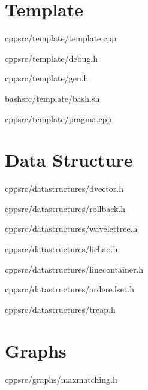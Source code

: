 \documentclass[portrait, 8pt, a4paper, oneside, twocolumn]{extarticle}
\begin{document}
\maketitlepage


\noindent\hrulefill

    \section{Template}
    {}
    {}
    {cpp}{src/template/template.cpp}

    \noindent\hrulefill

    {}
    {}
    {cpp}{src/template/debug.h}
    \noindent\hrulefill

    {}
    {}
    {cpp}{src/template/gen.h}
    \noindent\hrulefill

    {}
    {}
    {bash}{src/template/bash.sh}
    \noindent\hrulefill

    {}
    {}
    {cpp}{src/template/pragma.cpp}
    \noindent\hrulefill

\section{Data Structure}
    {}
    {}
    {cpp}{src/datastructures/dvector.h}
    \noindent\hrulefill

    {}
    {}
    {cpp}{src/datastructures/rollback.h}
    \noindent\hrulefill

    {}
    {}
    {cpp}{src/datastructures/wavelettree.h}
    \noindent\hrulefill

    {}
    {}
    {cpp}{src/datastructures/lichao.h}
    \noindent\hrulefill

    {}
    {}
    {cpp}{src/datastructures/linecontainer.h}
    \noindent\hrulefill

    {}
    {}
    {cpp}{src/datastructures/orderedset.h}
    \noindent\hrulefill

    {}
    {}
    {cpp}{src/datastructures/treap.h}
    \noindent\hrulefill

\section{Graphs}
    {}
    {}
    {cpp}{src/graphs/maxmatching.h}
    \noindent\hrulefill
\end{document}
